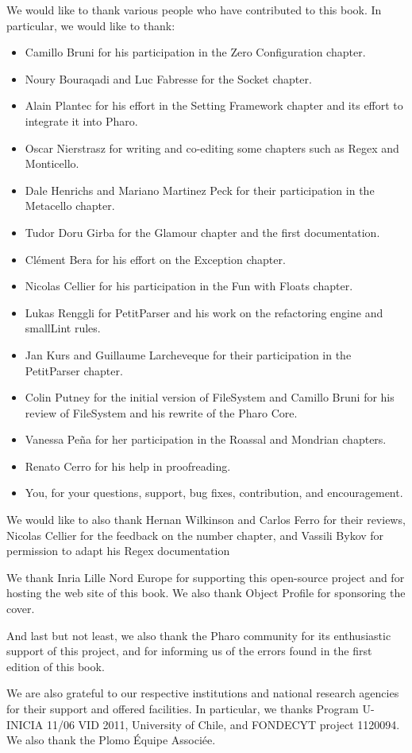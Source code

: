 \documentclass[a4paper,10pt,twoside]{book}
\begin{document}
We would like to thank various people who have contributed to this book. In particular, we would like to thank:
\begin{itemize}
\item Camillo Bruni for his participation in the Zero Configuration chapter.
\item Noury Bouraqadi and Luc Fabresse for the Socket chapter.
\item Alain Plantec for his effort in the Setting Framework chapter and its effort to integrate it into Pharo.
\item Oscar Nierstrasz for writing and co-editing some chapters such as Regex and Monticello.
\item Dale Henrichs and Mariano Martinez Peck for their participation in the Metacello chapter.
\item Tudor Doru Girba for the Glamour chapter and the first documentation.
\item Cl\'ement Bera for his effort on the Exception chapter.
\item Nicolas Cellier for his participation in the Fun with Floats chapter.
\item Lukas Renggli for PetitParser and his work on the refactoring engine and smallLint rules. 
\item Jan Kurs and Guillaume Larcheveque for their participation in the PetitParser chapter.
\item Colin Putney for the initial version of FileSystem and Camillo Bruni for his review of FileSystem and his rewrite of the Pharo Core.
\item Vanessa Pe\~na for her participation in the Roassal and Mondrian chapters.
\item Renato Cerro for his help in proofreading.
\item You, for your questions, support, bug fixes, contribution, and encouragement.
\end{itemize}

We would like to also thank Hernan Wilkinson and Carlos Ferro for their reviews, Nicolas Cellier for the feedback on the number chapter, and Vassili Bykov for permission to adapt his Regex documentation

We thank Inria Lille Nord Europe for supporting this open-source project and for hosting the web site of this book. We also thank Object Profile for sponsoring the cover.

And last but not least, we also thank the Pharo community for its enthusiastic support of this project, and for informing us of the errors found in the first edition of this book.

We are also grateful to our respective institutions and national research agencies for their support and offered facilities. In particular, we thanks Program U-INICIA 11/06 VID 2011, University of Chile, and FONDECYT project 1120094. We also thank the Plomo \'Equipe Associ\'ee.

\ifx\wholebook\relax\else
   
   
\end{document}
